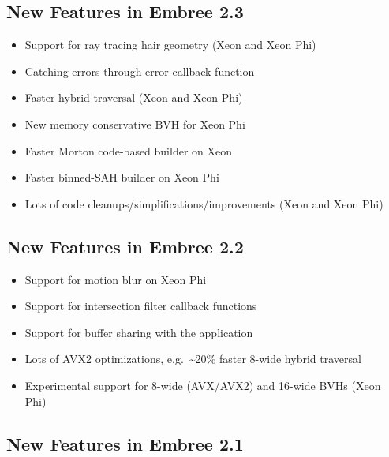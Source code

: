 \subsection{New Features in Embree
2.3}\label{new-features-in-embree-2.3}

\begin{itemize}
\tightlist
\item
  Support for ray tracing hair geometry (Xeon and Xeon Phi)
\item
  Catching errors through error callback function
\item
  Faster hybrid traversal (Xeon and Xeon Phi)
\item
  New memory conservative BVH for Xeon Phi
\item
  Faster Morton code-based builder on Xeon
\item
  Faster binned-SAH builder on Xeon Phi
\item
  Lots of code cleanups/simplifications/improvements (Xeon and Xeon Phi)
\end{itemize}

\subsection{New Features in Embree
2.2}\label{new-features-in-embree-2.2}

\begin{itemize}
\tightlist
\item
  Support for motion blur on Xeon Phi
\item
  Support for intersection filter callback functions
\item
  Support for buffer sharing with the application
\item
  Lots of AVX2 optimizations, e.g.~\textasciitilde20\% faster 8-wide
  hybrid traversal
\item
  Experimental support for 8-wide (AVX/AVX2) and 16-wide BVHs (Xeon Phi)
\end{itemize}

\subsection{New Features in Embree
2.1}\label{new-features-in-embree-2.1}

